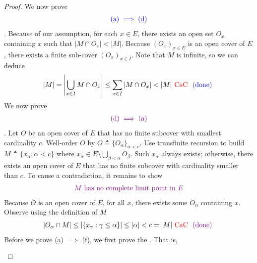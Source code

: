 \documentclass{report}
\begin{document}
\begin{proof}
We now prove 
\begin{align*}
\textcolor{blue}{(\text{a})\implies (\text{d})}
\end{align*}
. Because of our assumption, for each $x \in E$, there exists an open set $O_x$ containing $x$ such that $|M \cap O_x| < |M|$. Because $(O_x)_{x \in E}$ is an open cover of $E$, there exists a finite sub-cover $(O_x)_{x \in I}$. Note that $M$ is infinite, so we can deduce
\begin{align*}
|M| = \left| \bigcup_{x \in I} M \cap O_x \right| \leq \sum_{x \in I} |M \cap O_x| < |M| \text{ \textcolor{red}{CaC} } \textcolor{blue}{\text{ (done) }}
\end{align*}
We now prove 
\begin{align*}
\textcolor{violet}{(\text{d})\implies (\text{a})}
\end{align*}
. Let $O$ be an open cover of $E$ that has no finite subcover with smallest cardinality $c$. Well-order $O$ by $O \triangleq \{O_\alpha\}_{\alpha < c}$. Use transfinite recursion to build $M \triangleq \{x_\alpha : \alpha < c\}$ where $x_\alpha \in E \setminus \bigcup_{\beta < \alpha} O_\beta$. Such $x_\alpha$ always exists; otherwise, there exists an open cover of $E$ that has no finite subcover with cardinality smaller than $c$. To cause a contradiction, it remains to show
\begin{align*}
  \textcolor{violet}{M\text{  has no complete limit point in }E}
\end{align*}
Because $O$ is an open cover of $E$, for all $x$, there exists some $O_\alpha$ containing $x$. Observe using the definition of $M$
\begin{align*}
|O_\alpha \cap M| \leq |\{x_\gamma : \gamma \leq \alpha\}| \leq |\alpha| < c = |M| \text{ \textcolor{red}{CaC} } \textcolor{violet}{\text{ (done) }}
\end{align*}
Before we prove (a) $\implies$ (f), we first prove the . That is,
\begin{center}
   \begin{minipage}{0.9\linewidth}  
   \end{minipage}
\end{center}

\end{proof}
\end{document}
